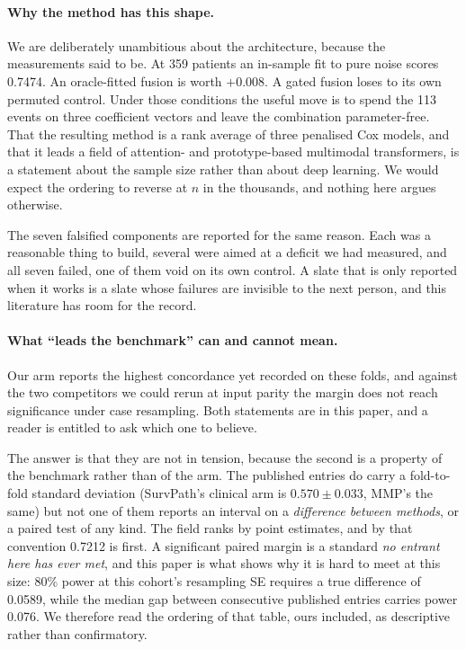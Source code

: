 \documentclass[unnumsec,webpdf,contemporary,large]{oup-authoring-template}
\begin{document}
\paragraph{Why the method has this shape.} We are deliberately unambitious about the architecture, because the
measurements said to be. At 359 patients an in-sample fit to pure noise scores 0.7474. An
oracle-fitted fusion is worth $+0.008$. A gated fusion loses to its own permuted control. Under
those conditions the useful move is to spend the 113 events on three coefficient vectors and leave
the combination parameter-free. That the resulting method is a rank average of three penalised Cox
models, and that it leads a field of attention- and prototype-based multimodal transformers, is a
statement about the sample size rather than about deep learning. We would expect the ordering to
reverse at $n$ in the thousands, and nothing here argues otherwise.

The seven falsified components are reported for the same reason. Each was a reasonable thing to
build, several were aimed at a deficit we had measured, and all seven failed, one of them void on
its own control. A slate that is only reported when it works is a slate whose failures are
invisible to the next person, and this literature has room for the record.

\paragraph{What ``leads the benchmark'' can and cannot mean.} Our arm reports the highest
concordance yet recorded on these folds, and against the two competitors we could rerun at input
parity the margin does not reach significance under case resampling. Both statements are in this
paper, and a reader is entitled to ask which one to believe.

The answer is that they are not in tension, because the second is a property of the benchmark rather
than of the arm. The published entries do carry a fold-to-fold standard deviation (SurvPath's clinical arm is $0.570\pm0.033$, MMP's the same) but not one of them reports an interval on a
\emph{difference between methods}, or a paired test of any kind. The field ranks by point
estimates, and by that convention 0.7212 is first. A
significant paired margin is a standard \emph{no entrant here has ever met}, and this paper is
what shows why it is hard to meet at this size: 80\% power at this cohort's resampling SE requires a true
difference of 0.0589, while the median gap between consecutive published entries carries power
0.076. We therefore read the ordering of that table, ours included, as descriptive rather than
confirmatory.
\end{document}
